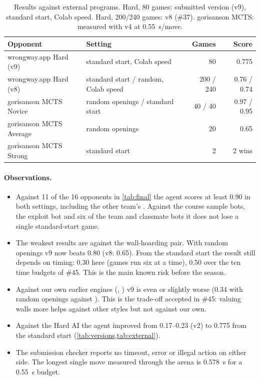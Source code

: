 \begin{table}[!htbp]
\centering\small
\caption{Results against external programs. Hard, 80 games: submitted version (v9), standard
start, Colab speed. Hard, 200/240 games: v8 (\#37). gorisanson MCTS: measured with v4 at
\SI{0.55}{\second}/move.}
\label{tab:external}
\begin{tabular}{@{}l l r r@{}}
\toprule
Opponent & Setting & Games & Score \\
\midrule
wrongway.app Hard (v9) & standard start, Colab speed & 80 & 0.775 \\
wrongway.app Hard (v8) & standard start / random, Colab speed & 200 / 240 & 0.76 / 0.74 \\
gorisanson MCTS Novice & random openings / standard start & 40 / 40 & 0.97 / 0.95 \\
gorisanson MCTS Average & random openings & 20 & 0.65 \\
gorisanson MCTS Strong & standard start & 2 & 2 wins \\
\bottomrule
\end{tabular}
\end{table}

\paragraph{Observations.}
\begin{itemize}
  \item Against 11 of the 16 opponents in \cref{tab:final} the agent scores at least 0.90 in
        both settings, including the other team's . Against the course sample
        bots, the exploit bot and six of the team and classmate bots it does not lose a single
        standard-start game.
  \item The weakest results are against the wall-hoarding pair. With random openings v9 now beats
         0.80 (v8: 0.65). From the standard start the result still depends on
        timing: 0.30 here (games run six at a time), 0.50 over the ten time budgets of \#45. This
        is the main known risk before the season.
  \item Against our own earlier engines (, ) v9 is even
        or slightly worse (0.34 with random openings against ). This is the
        trade-off accepted in \#45: valuing walls more helps against other styles but not against
        our own.
  \item Against the Hard AI the agent improved from 0.17--0.23 (v2) to 0.775 from the standard
        start (\cref{tab:versions,tab:external}).
  \item The submission checker reports no timeout, error or illegal action on either side. The
        longest single move measured through the arena is \SI{0.578}{\second} for a
        \SI{0.55}{\second} budget.
\end{itemize}

